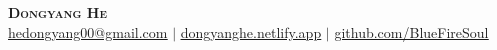 \begin{center}
    \textbf{\huge \scshape Dongyang He} \\ \vspace{1pt}
    \small \href{mailto:hedongyang00@gmail.com}{\underline{hedongyang00@gmail.com}} $|$ \href{https://dongyanghe.netlify.app}{\underline{dongyanghe.netlify.app}} $|$ \href{https://github.com/BlueFireSoul}{\underline{github.com/BlueFireSoul}} 
\end{center}